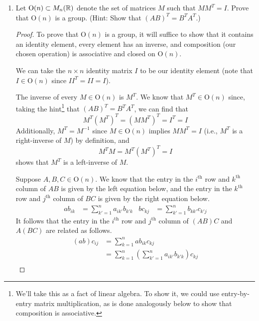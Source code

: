 \documentclass[../psets.tex]{subfiles}
\begin{document}
\begin{enumerate}
    \begin{enumerate}
        \item Let $\text{O}(n)\subset M_n(\mathbb{R})$ denote the set of matrices $M$ such that $MM^T=I$. Prove that $\text{O}(n)$ is a group. (Hint: Show that $(AB)^T=B^TA^T$.)
        \begin{proof}
            To prove that $\text{O}(n)$ is a group, it will suffice to show that it contains an identity element, every element has an inverse, and composition (our chosen operation) is associative and closed on $\text{O}(n)$.\par
            We can take the $n\times n$ identity matrix $I$ to be our identity element (note that $I\in\text{O}(n)$ since $II^T=II=I$).\par
            The inverse of every $M\in\text{O}(n)$ is $M^T$. We know that $M^T\in\text{O}(n)$ since, taking the hint\footnote{We'll take this as a fact of linear algebra. To show it, we could use entry-by-entry matrix multiplication, as is done analogously below to show that composition is associative.} that $(AB)^T=B^TA^T$, we can find that
            \begin{equation*}
                M^T(M^T)^T = (MM^T)^T
                = I^T
                = I
            \end{equation*}
            Additionally, $M^T=M^{-1}$ since $M\in\text{O}(n)$ implies $MM^T=I$ (i.e., $M^T$ is a right-inverse of $M$) by definition, and
            \begin{equation*}
                M^TM = M^T(M^T)^T
                = I
            \end{equation*}
            shows that $M^T$ is a left-inverse of $M$.\par
            Suppose $A,B,C\in\text{O}(n)$. We know that the entry in the $i^\text{th}$ row and $k^\text{th}$ column of $AB$ is given by the left equation below, and the entry in the $k^\text{th}$ row and $j^\text{th}$ column of $BC$ is given by the right equation below.
            \begin{align*}
                ab_{ik} &= \sum_{k'=1}^na_{ik'}b_{k'k}&
                bc_{kj} &= \sum_{k'=1}^nb_{kk'}c_{k'j}
            \end{align*}
            It follows that the entry in the $i^\text{th}$ row and $j^\text{th}$ column of $(AB)C$ and $A(BC)$ are related as follows.
            \begin{align*}
                (ab)c_{ij} &= \sum_{k=1}^nab_{ik}c_{kj}\\
                &= \sum_{k=1}^n\left( \sum_{k'=1}^na_{ik'}b_{k'k} \right)c_{kj}\\

\end{align*}
\end{proof}
\end{enumerate}
\end{enumerate}
\end{document}
